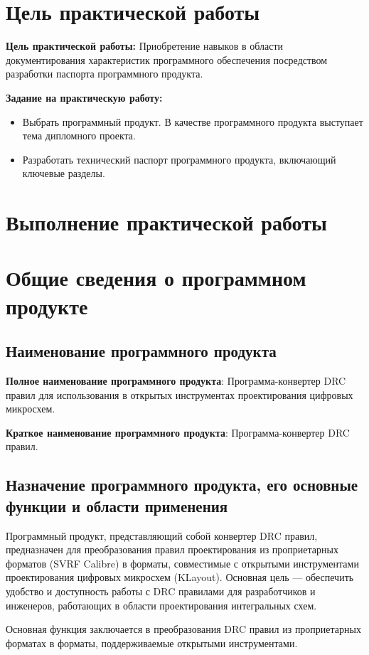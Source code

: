 \section*{\LARGE Цель практической работы}

\textbf{Цель практической работы:}
Приобретение навыков в области документирования характеристик
программного обеспечения посредством разработки
паспорта программного продукта.

\textbf{Задание на практическую работу:}

\begin{itemize}
	\item Выбрать программный продукт. В качестве программного продукта
		выступает тема дипломного проекта.
	\item Разработать технический паспорт программного продукта,
		включающий ключевые разделы.
\end{itemize}

\clearpage

\section*{\LARGE Выполнение практической работы}

\section{Общие сведения о программном продукте}

\subsection{Наименование программного продукта}

\textbf{Полное наименование программного продукта}:
Программа-конвертер DRC правил для использования
в открытых инструментах проектирования цифровых микросхем.

\textbf{Краткое наименование программного продукта}:
Программа-конвертер DRC правил.

\subsection{Назначение программного продукта,
	его основные функции и области применения}

Программный продукт, представляющий собой конвертер DRC правил,
предназначен для преобразования правил проектирования
из проприетарных форматов (SVRF Calibre) в форматы, совместимые
с открытыми инструментами проектирования цифровых микросхем (KLayout).
Основная цель --- обеспечить удобство
и доступность работы с DRC правилами для разработчиков и инженеров,
работающих в области проектирования интегральных схем.\par
Основная функция заключается в преобразования DRC правил
из проприетарных форматах в форматы,
поддерживаемые открытыми инструментами.


